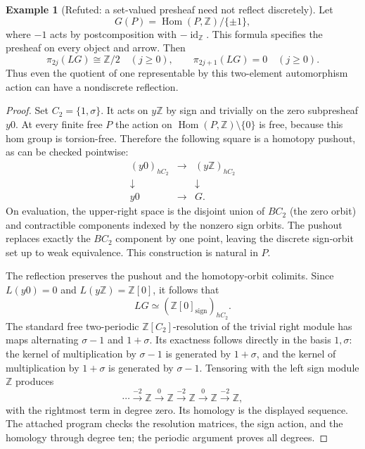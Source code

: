 \documentclass[11pt,a4paper]{article}
\theoremstyle{definition}
\newtheorem{example}[theorem]{Example}
\begin{document}
\begin{example}[Refuted: a set-valued presheaf need not reflect discretely]\label{main:sign}
Let
\[
 G(P)=\operatorname{Hom}(P,\mathbb Z)/\{\pm1\},
\]
where $-1$ acts by postcomposition with $-\operatorname{id}_{\mathbb Z}$.
This formula specifies the presheaf on every object and arrow. Then
\[
 \pi_{2j}(LG)\cong\mathbb Z/2\quad(j\geq0),\qquad
 \pi_{2j+1}(LG)=0\quad(j\geq0).
\]
Thus even the quotient of one representable by this two-element
automorphism action can have a nondiscrete reflection.
\end{example}
\begin{proof}
Set $C_2=\{1,\sigma\}$. It acts on $y\mathbb Z$ by sign and trivially
on the zero subpresheaf $y0$. At every finite free $P$ the action on
$\operatorname{Hom}(P,\mathbb Z)\setminus\{0\}$ is free, because this
hom group is torsion-free. Therefore the following square is a homotopy
pushout, as can be checked pointwise:
\[
\begin{array}{ccc}
 (y0)_{hC_2}&\longrightarrow&(y\mathbb Z)_{hC_2}\\
 \downarrow&&\downarrow\\
 y0&\longrightarrow&G.
\end{array}
\]
On evaluation, the upper-right space is the disjoint union of $BC_2$
(the zero orbit) and contractible components indexed by the nonzero
sign orbits. The pushout replaces exactly the $BC_2$ component by one
point, leaving the discrete sign-orbit set up to weak equivalence.
This construction is natural in $P$.

The reflection preserves the pushout and the homotopy-orbit colimits.
Since $L(y0)=0$ and $L(y\mathbb Z)=\mathbb Z[0]$, it follows that
\[
 LG\simeq (\mathbb Z[0]_{\mathrm{sign}})_{hC_2}.
\]
The standard free two-periodic $\mathbb Z[C_2]$-resolution of the trivial
right module has maps alternating $\sigma-1$ and $1+\sigma$.
Its exactness follows directly in the basis $1,\sigma$:
the kernel of multiplication by $\sigma-1$ is generated by $1+\sigma$,
and the kernel of multiplication by $1+\sigma$ is generated by
$\sigma-1$. Tensoring with the left sign module $\mathbb Z$ produces
\[
 \cdots\xrightarrow{-2}\mathbb Z\xrightarrow{0}\mathbb Z
 \xrightarrow{-2}\mathbb Z\xrightarrow{0}\mathbb Z
 \xrightarrow{-2}\mathbb Z,
\]
with the rightmost term in degree zero. Its homology is the displayed
sequence. The attached program checks the resolution matrices, the sign
action, and the homology through degree ten; the periodic argument
proves all degrees.
\end{proof}
\end{document}
